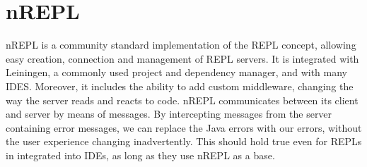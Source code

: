 \documentclass[12pt]{article}
\begin{document}
\section{nREPL}
nREPL is a community standard implementation of the REPL concept,
allowing easy creation, connection and management of REPL servers.
It is integrated with Leiningen, a commonly used project and dependency manager,
 and with many IDES. Moreover, it includes the ability to add custom middleware,
  changing the way the server reads and reacts to code.
 nREPL communicates between its client and server by means of messages.
 By intercepting messages from the server containing error messages,
 we can replace the Java errors with our errors,
  without the user experience changing inadvertently.
This should hold true even for REPLs in integrated into IDEs, as long as they
 use nREPL as a base.
\end{document}
